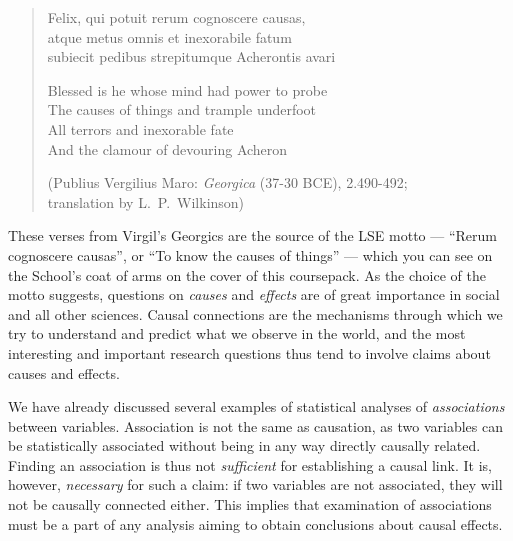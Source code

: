 \begin{verse}
Felix, qui potuit rerum cognoscere causas,\\
atque metus omnis et inexorabile fatum\\
subiecit pedibus strepitumque Acherontis avari

\vspace*{1ex}
Blessed is he whose mind had power to probe\\
The causes of things and trample underfoot\\
All terrors and inexorable fate\\
And the clamour of devouring Acheron

\vspace*{1ex}
(Publius Vergilius Maro: \emph{Georgica} (37-30 BCE), 2.490-492;\\
translation by L.\ P.\ Wilkinson)
\end{verse}
These verses from Virgil's Georgics are the source of the LSE motto ---
``Rerum cognoscere causas'', or ``To know the causes of things'' ---
which you can see on the School's coat of arms on the cover of this
coursepack. As the choice of the motto suggests, questions on
\emph{causes} and \emph{effects} are of great importance in social and
all other sciences. Causal connections are the mechanisms through which
we try to understand and predict what we observe in the world, and the
most interesting and important research questions thus tend to involve
claims about causes and effects.

We have already discussed several examples of statistical analyses of
\emph{associations} between variables. Association is not the same as
causation, as two variables can be statistically associated without
being in any way directly causally related. Finding an association is
thus not \emph{sufficient} for establishing a causal link. It is,
however, \emph{necessary} for such a claim: if two variables are not
associated, they will not be causally connected either. This implies
that examination of associations must be a part of any analysis aiming
to obtain conclusions about causal effects.

